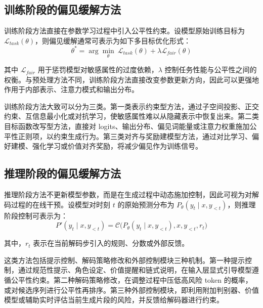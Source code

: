 \subsection{训练阶段的偏见缓解方法}

训练阶段方法直接在参数学习过程中引入公平性约束。设模型原始训练目标为 $\mathcal{L}_{task}(\theta)$，则偏见缓解通常可表示为如下多目标优化形式：
\begin{equation}
\theta^{*}=\arg\min_{\theta}\ \mathcal{L}_{task}(\theta)+\lambda \mathcal{L}_{fair}(\theta)
\end{equation}

其中 $\mathcal{L}_{fair}$ 用于惩罚模型对敏感属性的过度依赖，$\lambda$ 控制任务性能与公平性之间的权衡。与预处理方法不同，训练阶段方法直接改变参数更新方向，因此可以更强地作用于内部表示、注意力模式和输出分布。

训练阶段方法大致可以分为三类。第一类表示约束型方法，通过子空间投影、正交约束、互信息最小化或对抗学习，使敏感属性难以从隐藏表示中恢复出来\cite{DBLP:conf/acl/RavfogelEGTG20,DBLP:conf/acl/LiangLZLSM20,DBLP:conf/icassp/WooNJL23}。第二类目标函数改写型方法，直接对 logits、输出分布、偏见词能量或注意力权重施加公平性正则项，以约束生成行为\cite{DBLP:conf/acl/GuoYA22,DBLP:conf/emnlp/GaciBCB22}。第三类对齐与奖励建模型方法，通过对比学习、偏好建模、强化学习或价值对齐奖励，将减少偏见作为训练信号\cite{DBLP:conf/acl/ZhengK0H23,DBLP:conf/naacl/JinBKDNR21}。

\subsection{推理阶段的偏见缓解方法}

推理阶段方法不更新模型参数，而是在生成过程中动态施加控制，因此可视为对解码过程的在线干预。设模型对时刻 $t$ 的原始预测分布为 $P_{\theta}(y_t \mid x, y_{<t})$，则推理阶段控制可表示为：
\begin{equation}
P'(y_t \mid x, y_{<t})=\mathcal{C}\big(P_{\theta}(y_t \mid x, y_{<t}), x, y_{<t}, r_t\big)
\end{equation}

其中，$r_t$ 表示在当前解码步引入的规则、分数或外部反馈。

这类方法包括提示控制、解码策略修改和外部控制模块三种机制。第一种提示控制，通过规范性提示、角色设定、价值提醒和链式说明，在输入层显式引导模型遵循公平性约束\cite{DBLP:conf/acl/SaundersSB22,DBLP:conf/emnlp/MeadeGHGJRLH23}。第二种解码策略修改，在调整过程中压低高风险 token 的概率，或对候选序列进行公平性再排序。第三种外部控制模块，即利用附加判别器、价值模型或辅助实时评估当前生成片段的风险，并反馈给解码器进行约束\cite{DBLP:conf/acl/LiuKW23,DBLP:conf/acl/HauzenbergerMKS23}。

